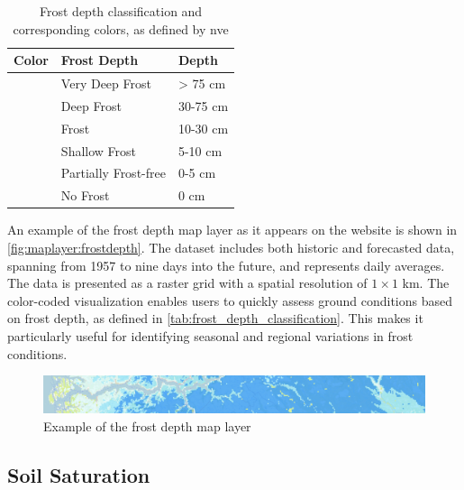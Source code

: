 \begin{table}[h]
    \centering
    \begin{tabular}{|l|l|l|}
        \hline  
        \textbf{Color} & \textbf{Frost Depth} & \textbf{Depth} \\
        \hline
        \cellcolor[HTML]{00009c} & Very Deep Frost & > 75 cm \\
        \hline
        \cellcolor[HTML]{0018ff} & Deep Frost & 30-75 cm \\
        \hline
        \cellcolor[HTML]{009aff} & Frost & 10-30 cm \\
        \hline
        \cellcolor[HTML]{84ebff} & Shallow Frost & 5-10 cm \\
        \hline
        \cellcolor[HTML]{deffff} & Partially Frost-free & 0-5 cm \\
        \hline
        \cellcolor[HTML]{cef77b} & No Frost & 0 cm \\
        \hline
    \end{tabular}
    \caption[Frost depth classification and corresponding colors]{Frost depth classification and corresponding colors, as defined by \acrshort{nve} \cite{nve2025waterdata}}
    \label{tab:frost_depth_classification}
\end{table}

An example of the frost depth map layer as it appears on the website is shown in \autoref{fig:maplayer:frostdepth}. The dataset includes both historic and forecasted data, spanning from 1957 to nine days into the future, and represents daily averages. The data is presented as a raster grid with a spatial resolution of $1 \times 1$ km. The color-coded visualization enables users to quickly assess ground conditions based on frost depth, as defined in \autoref{tab:frost_depth_classification}. This makes it particularly useful for identifying seasonal and regional variations in frost conditions.

\begin{figure}[h]
    \centering
    \includegraphics[width=1\linewidth]{images/maplayers/frostdepth.png}
    \caption{Example of the frost depth map layer}
    \label{fig:maplayer:frostdepth}
\end{figure}

\subsection{Soil Saturation}\label{subsec:soilsaturation}


